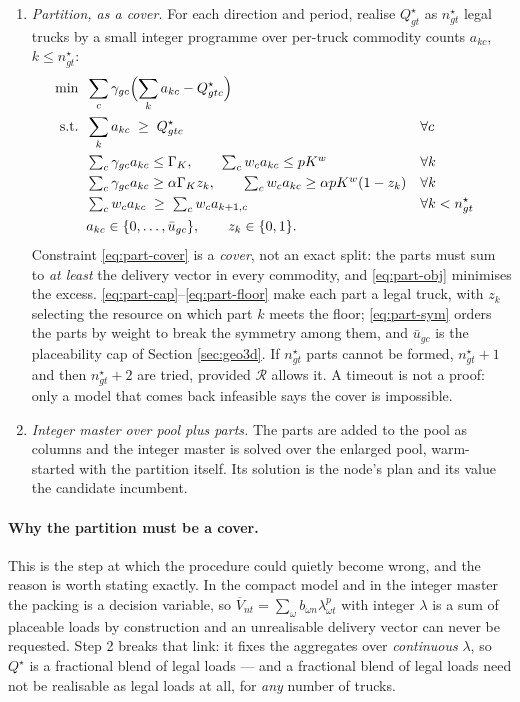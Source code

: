 \begin{enumerate}
\item \emph{Partition, as a cover.} For each direction and period,
  realise $Q^{\star}_{gt}$ as $n^{\star}_{gt}$ legal trucks by a small
  integer programme over per-truck commodity counts $a_{kc}$,
  $k\le n^{\star}_{gt}$:
  \begin{align}
    \min\;\;&\sum_{c}\gamma_{gc}\Bigl(\sum_{k}a_{kc}-Q^{\star}_{gtc}\Bigr)
      \label{eq:part-obj}\\
    \text{s.t.}\;\;&\sum_{k}a_{kc}\;\ge\;Q^{\star}_{gtc} &&\forall c
      \label{eq:part-cover}\\
    &\textstyle\sum_{c}\gamma_{gc}a_{kc}\le\Gamma_{K},\qquad
     \sum_{c}w_{c}a_{kc}\le pK^{w} &&\forall k
      \label{eq:part-cap}\\
    &\textstyle\sum_{c}\gamma_{gc}a_{kc}\ge\alpha\Gamma_{K}z_{k},\qquad
     \sum_{c}w_{c}a_{kc}\ge\alpha pK^{w}(1-z_{k}) &&\forall k
      \label{eq:part-floor}\\
    &\textstyle\sum_{c}w_{c}a_{kc}\;\ge\;\sum_{c}w_{c}a_{k+1,c}
      &&\forall k<n^{\star}_{gt}
      \label{eq:part-sym}\\
    &a_{kc}\in\{0,\dots,\bar u_{gc}\},\qquad z_{k}\in\{0,1\}.\nonumber
  \end{align}
  Constraint \eqref{eq:part-cover} is a \emph{cover}, not an exact
  split: the parts must sum to \emph{at least} the delivery vector in
  every commodity, and \eqref{eq:part-obj} minimises the excess.
  \eqref{eq:part-cap}--\eqref{eq:part-floor} make each part a legal
  truck, with $z_{k}$ selecting the resource on which part $k$ meets
  the floor; \eqref{eq:part-sym} orders the parts by weight to break
  the symmetry among them, and $\bar u_{gc}$ is the placeability cap of
  Section \ref{sec:geo3d}. If $n^{\star}_{gt}$ parts cannot be formed,
  $n^{\star}_{gt}+1$ and then $n^{\star}_{gt}+2$ are tried, provided
  $\mathcal{R}$ allows it. A timeout is not a proof: only a model that
  comes back infeasible says the cover is impossible.

\item \emph{Integer master over pool plus parts.} The parts are added
  to the pool as columns and the integer master is solved over the
  enlarged pool, warm-started with the partition itself. Its solution
  is the node's plan and its value the candidate incumbent.
\end{enumerate}

\paragraph{Why the partition must be a cover.}
This is the step at which the procedure could quietly become wrong, and
the reason is worth stating exactly. In the compact model and in the
integer master the packing is a decision variable, so
$\overline{V}_{nt}=\sum_{\omega}b_{\omega n}\lambda^{p}_{\omega t}$
with integer $\lambda$ is a sum of placeable loads by construction and
an unrealisable delivery vector can never be requested. Step 2 breaks
that link: it fixes the aggregates over \emph{continuous} $\lambda$, so
$Q^{\star}$ is a fractional blend of legal loads --- and a fractional
blend of legal loads need not be realisable as legal loads at all, for
\emph{any} number of trucks.

